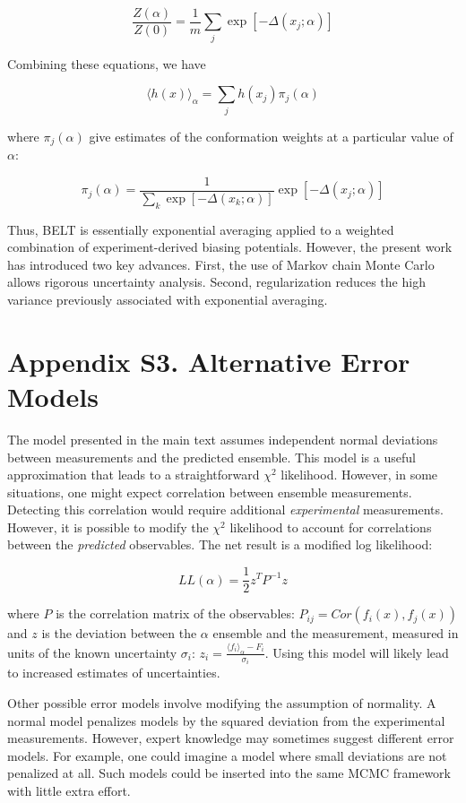 \documentclass[journal=jacsat,manuscript=article]{achemso}
\begin{document}
$$ \frac{Z(\alpha)}{Z(0)} = \frac{1}{m} \sum_j \exp[-\Delta(x_j;\alpha)]$$

Combining these equations, we have

$$\langle h(x)\rangle _\alpha = \sum_j h(x_j) \pi_j(\alpha)$$

where $\pi_j(\alpha)$ give estimates of the conformation weights at a particular value of $\alpha$:

$$\pi_j(\alpha) = \frac{1}{\sum_k \exp[-\Delta(x_k;\alpha)]} \exp[-\Delta(x_j;\alpha)]$$

Thus, BELT is essentially exponential averaging applied to a weighted combination of experiment-derived biasing potentials.  However, the present work has introduced two key advances.  First, the use of Markov chain Monte Carlo allows rigorous uncertainty analysis.  Second, regularization reduces the high variance previously associated with exponential averaging.  

\newpage

\section{Appendix S3.  Alternative Error Models}

The model presented in the main text assumes independent normal deviations between measurements and the predicted ensemble.  This model is a useful approximation that leads to a straightforward $\chi^2$ likelihood.  However, in some situations, one might expect correlation between ensemble measurements.  Detecting this correlation would require additional \emph{experimental} measurements.  However, it is possible to modify the $\chi^2$ likelihood to account for correlations between the \emph{predicted} observables.  The net result is a modified log likelihood:

$$L L(\alpha) = \frac{1}{2} z^T P^{-1} z$$

where $P$ is the correlation matrix of the observables: $P_{ij} = Cor(f_i(x), f_j(x))$ and $z$ is the deviation between the $\alpha$ ensemble and the measurement, measured in units of the known uncertainty $\sigma_i$: $z_i = \frac{\langle f_i\rangle _\alpha - F_i}{\sigma_i}$.  Using this model will likely lead to increased estimates of uncertainties.  

Other possible error models involve modifying the assumption of normality.  A normal model penalizes models by the squared deviation from the experimental measurements.  However, expert knowledge may sometimes suggest different error models.  For example, one could imagine a model where small deviations are not penalized at all.  Such models could be inserted into the same MCMC framework with little extra effort.
\end{document}

